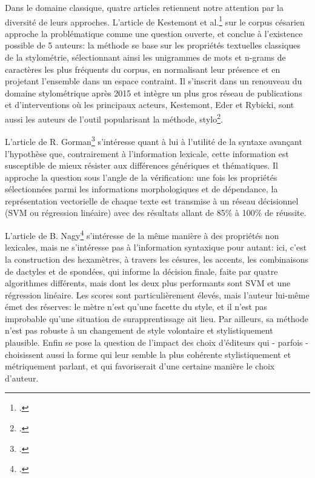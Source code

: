 Dans le domaine classique, quatre articles retiennent notre attention par la diversité de leurs approches. L'article de Kestemont et al.\footcite{kestemont_authenticating_2016} sur le corpus césarien approche la problématique comme une question ouverte, et conclue à l'existence possible de 5 auteurs: la méthode se base sur les propriétés textuelles classiques de la stylométrie, sélectionnant ainsi les unigrammes de mots et n-grams de caractères les plus fréquents du corpus, en normalisant leur présence et en projetant l'ensemble dans un espace contraint. Il s'inscrit dans un renouveau du domaine stylométrique après 2015 et intègre un plus gros réseau de publications et d'interventions où les principaux acteurs, Kestemont, Eder et Rybicki, sont aussi les auteurs de l'outil popularisant la méthode, stylo\footcite{stylo_r}. %

L'article de R. Gorman\footcite{gorman_author_2020} s'intéresse quant à lui à l'utilité de la syntaxe avançant l'hypothèse que, contrairement à l'information lexicale, cette information est susceptible de mieux résister aux différences génériques et thématiques. Il approche la question sous l'angle de la vérification: une fois les propriétés sélectionnées parmi les informations morphologiques et de dépendance, la représentation vectorielle de chaque texte est transmise à un réseau décisionnel (SVM ou régression linéaire) avec des résultats allant de 85\% à 100\% de réussite.

L'article de B. Nagy\footcite{nagy_metre_2021} s'intéresse de la même manière à des propriétés non lexicales, mais ne s'intéresse pas à l'information syntaxique pour autant: ici, c'est la construction des hexamètres, à travers les césures, les accents, les combinaisons de dactyles et de spondées, qui informe la décision finale, faite par quatre algorithmes différents, mais dont les deux plus performants sont SVM et une régression linéaire. Les scores sont particulièrement élevés, mais l'auteur lui-même émet des réserves: le mètre n'est qu'une facette du style, et il n'est pas improbable qu'une situation de surapprentissage ait lieu. Par ailleurs, sa méthode n'est pas robuste à un changement de style volontaire et stylistiquement plausible. Enfin se pose la question de l'impact des choix d'éditeurs qui - parfois - choisissent aussi la forme qui leur semble la plus cohérente stylistiquement et métriquement parlant, et qui favoriserait d'une certaine manière le choix d'auteur. 

